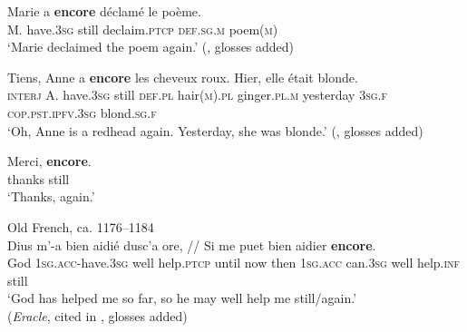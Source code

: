 \begin{exe}
	\ex
	\gll Marie a \textbf{encore} déclamé le poème.\\
	M. have.3\textsc{sg} still declaim.\textsc{ptcp} \textsc{def}.\textsc{sg}.\textsc{m} poem(\textsc{m})\\
	\glt \lq Marie declaimed the poem again.\rq{ }(\cite[9]{TovenaDonazzan2008}, glosses added)

	\ex
	\gll Tiens, Anne a \textbf{encore} les cheveux roux. Hier, elle était blonde.\\
	\textsc{interj} A. have.3\textsc{sg} still \textsc{def}.\textsc{pl} hair(\textsc{m}).\textsc{pl} ginger.\textsc{pl}.\textsc{m} yesterday 3\textsc{sg}.\textsc{f} \textsc{cop}.\textsc{pst}.\textsc{ipfv}.3\textsc{sg} blond.\textsc{sg}.\textsc{f}\\
	\glt \lq Oh, Anne is a redhead again. Yesterday, she was blonde.' (\cite[155]{MosegaardHansen2008}, glosses added)
	
	\ex\label{exAppendixFrenchEncore3}
	\gll Merci, \textbf{encore}.\\
	thanks still\\
	\glt \lq Thanks, again.' \parencite[226]{LangPerez2004}
	
	\ex Old French, ca. 1176–1184\label{exFrenchEncoreIterativeOld}\\
	\gll Dius m'-a bien aidié {dusc'a ore}, // Si me puet bien aidier \textbf{encore}.\\
	God 1\textsc{sg}.\textsc{acc}-have.3\textsc{sg} well help.\textsc{ptcp} {until now} {} then 1\textsc{sg}.\textsc{acc} can.3\textsc{sg} well help.\textsc{inf} still\\
	\glt \lq God has helped me so far, so he may well help me still/again.'
	\\(\textit{Eracle}, cited in \cite[156]{MosegaardHansen2008}, glosses added)
\end{exe}
